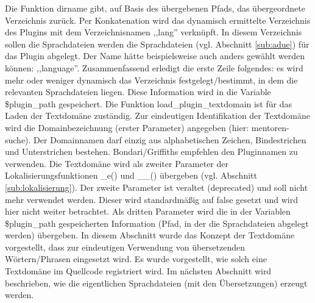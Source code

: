 Die Funktion dirname gibt,  auf Basis des übergebenen Pfads, das übergeordnete Verzeichnis zurück.
Per Konkatenation wird das dynamisch ermittelte Verzeichnis des Plugins mit dem Verzeichnisnamen ,,lang'' verknüpft. In diesem Verzeichnis sollen die Sprachdateien werden die Sprachdateien (vgl. Abschnitt \ref{sub:adue}) für das Plugin abgelegt. Der Name hätte beispielsweise auch anders gewählt werden können: ,,language''. \newline
Zusammenfassend erledigt die erste Zeile folgendes: es wird mehr oder weniger dynamisch das Verzeichnis festgelegt/bestimmt, in dem die relevanten Sprachdateien liegen. Diese Information wird in die Variable \$plugin\_path gespeichert.
Die Funktion load\_plugin\_textdomain ist für das Laden der Textdomäne zuständig. Zur eindeutigen Identifikation der Textdomäne wird die Domainbezeichnung (erster Parameter) angegeben (hier: mentoren-suche). Der Domainnamen darf einzig aus alphabetischen Zeichen, Bindestrichen und Unterstrichen bestehen. Bondari/Griffiths empfehlen den Pluginnamen zu verwenden.\newline
Die Textdomäne wird als zweiter Parameter der Lokalisierungsfunktionen \_e() und \_\_() übergeben (vgl. Abschnitt \ref{sub:lokalisierung}).\newline
Der zweite Parameter ist veraltet (deprecated) und soll nicht mehr verwendet werden. Dieser wird standardmäßig auf false gesetzt und wird hier nicht weiter betrachtet. Als dritten Parameter wird  die in der Variablen \$plugin\_path  gespeicherten Information (Pfad, in der die Sprachdateien abgelegt werden) übergeben.\newline
In diesem Abschnitt wurde das Konzept der Textdomäne vorgestellt, dass zur eindeutigen Verwendung von übersetzenden Wörtern/Phrasen eingesetzt wird. Es wurde vorgestellt, wie solch eine Textdomäne im Quellcode registriert wird. Im nächsten Abschnitt wird beschrieben, wie die eigentlichen Sprachdateien (mit den Übersetzungen) erzeugt werden.
